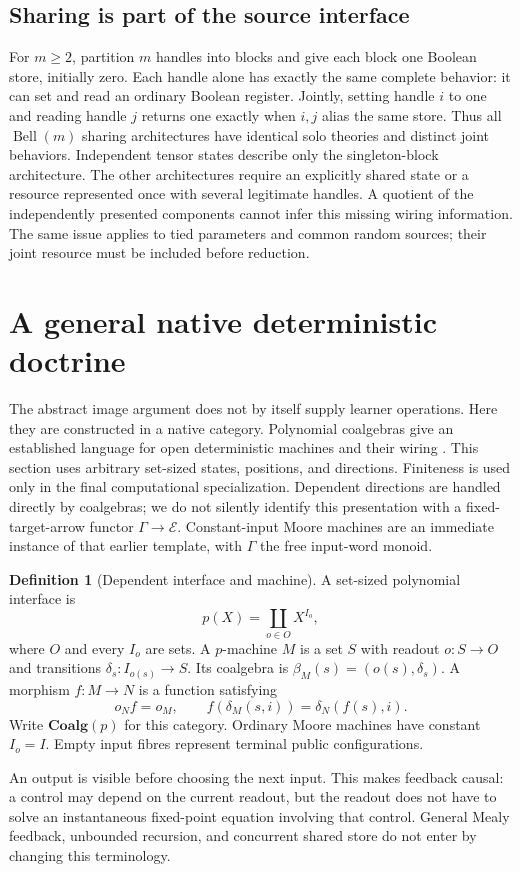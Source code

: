 \documentclass[11pt]{article}
\theoremstyle{definition}
\newtheorem{definition}[theorem]{Definition}
\theoremstyle{remark}\newtheorem{remark}[theorem]{Remark}
\newcommand{\E}{\mathcal E}
\newcommand{\Coalg}{\mathbf{Coalg}}
\begin{document}
\subsection{Sharing is part of the source interface}
For $m\geq2$, partition $m$ handles into blocks and give each block one
Boolean store, initially zero. Each handle alone has exactly the same
complete behavior: it can set and read an ordinary Boolean register.
Jointly, setting handle $i$ to one and reading handle $j$ returns one
exactly when $i,j$ alias the same store. Thus all $\operatorname{Bell}(m)$
sharing architectures have identical solo theories and distinct joint
behaviors. Independent tensor states describe only the singleton-block
architecture. The other architectures require an explicitly shared state
or a resource represented once with several legitimate handles. A quotient
of the independently presented components cannot infer this missing wiring
information. The same issue applies to tied parameters and common random
sources; their joint resource must be included before reduction.



\section{A general native deterministic doctrine}
\label{sec:poly}
The abstract image argument does not by itself supply learner operations.
Here they are constructed in a native category. Polynomial coalgebras give
an established language for open deterministic machines and their wiring
\cite{spivak,rutten}. This section uses arbitrary set-sized states, positions,
and directions. Finiteness is used only in the final computational
specialization. Dependent directions are handled directly by coalgebras;
we do not silently identify this presentation with a fixed-target-arrow
functor $\Gamma\to\E$. Constant-input Moore machines are an immediate
instance of that earlier template, with $\Gamma$ the free input-word monoid.

\begin{definition}[Dependent interface and machine]
A set-sized polynomial interface is
\[
 p(X)=\coprod_{o\in O}X^{I_o},
\]
where $O$ and every $I_o$ are sets. A $p$-machine $M$ is a set
$S$ with readout $o:S\to O$ and transitions
$\delta_s:I_{o(s)}\to S$. Its coalgebra is
$\beta_M(s)=(o(s),\delta_s)$. A morphism $f:M\to N$ is a function satisfying
\[
 o_Nf=o_M,\qquad f(\delta_M(s,i))=\delta_N(f(s),i).
\]
Write $\Coalg(p)$ for this category. Ordinary Moore machines have constant
$I_o=I$. Empty input fibres represent terminal public configurations.
\end{definition}
An output is visible before choosing the next input. This makes feedback
causal: a control may depend on the current readout, but the readout does
not have to solve an instantaneous fixed-point equation involving that
control. General Mealy feedback, unbounded recursion, and concurrent shared
store do not enter by changing this terminology.
\end{document}
